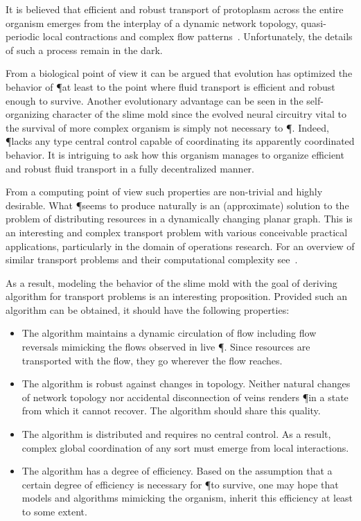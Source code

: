   It is believed that efficient and robust transport of protoplasm across the entire organism emerges from the interplay of a dynamic network topology, quasi-periodic local contractions and complex flow patterns~\cite{alim2013random,teplov1991continuum}. Unfortunately, the details of such a process remain in the dark.

  From a biological point of view it can be argued that evolution has optimized the behavior of \P at least to the point where fluid transport is efficient and robust enough to survive. Another evolutionary advantage can be seen in the self-organizing character of the slime mold since the evolved neural circuitry vital to the survival of more complex organism is simply not necessary to \P. Indeed, \P lacks any type central control capable of coordinating its apparently coordinated behavior. It is intriguing to ask how this organism manages to organize efficient and robust fluid transport in a fully decentralized manner.

  From a computing point of view such properties are non-trivial and highly desirable. What \P seems to produce naturally is an (approximate) solution to the problem of distributing resources in a dynamically changing planar graph. This is an interesting and complex transport problem with various conceivable practical applications, particularly in the domain of operations research. For an overview of similar transport problems and their computational complexity see~\cite{Ausiello:1999:CAC:554706,4567876,Hillier:1986:IOR:27036}.

  As a result, modeling the behavior of the slime mold with the goal of deriving algorithm for transport problems is an interesting proposition. Provided such an algorithm can be obtained, it should have the following properties:

  \begin{itemize}
  \item The algorithm maintains a dynamic circulation of flow including flow reversals mimicking the flows observed in live \P. Since resources are transported with the flow, they go wherever the flow reaches.
  \item The algorithm is robust against changes in topology. Neither natural changes of network topology nor accidental disconnection of veins renders \P in a state from which it cannot recover. The algorithm should share this quality.
  \item The algorithm is distributed and requires no central control. As a result, complex global coordination of any sort must emerge from local interactions.
  \item The algorithm has a degree of efficiency. Based on the assumption that a certain degree of efficiency is necessary for \P to survive, one may hope that models and algorithms mimicking the organism, inherit this efficiency at least to some extent.
  \end{itemize}

